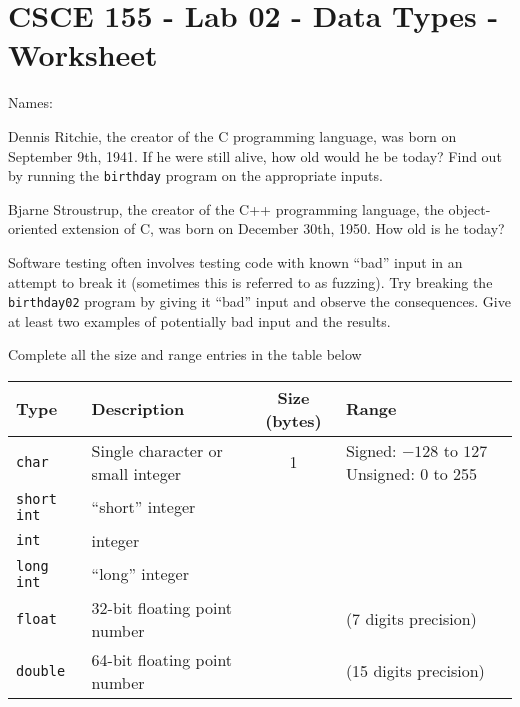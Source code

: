 \documentclass[12pt]{exam}
\begin{document}
\section*{CSCE 155 - Lab 02 - Data Types - Worksheet}

Names: \underline{\hspace{10cm}}

\begin{questions}

\question Dennis Ritchie, the creator of the C programming language,
was born on September 9th, 1941.  If he were still alive, how old
would he be today?  Find out by running the \texttt{birthday}
program on the appropriate inputs.

\begin{solution}[1cm]
\end{solution}

\question Bjarne Stroustrup, the creator of the C++ programming
language, the object-oriented extension of C, was born on December
30th, 1950.  How old is he today?

\begin{solution}[1cm]
\end{solution}

\question Software testing often involves testing code with known
``bad'' input in an attempt to break it (sometimes this is referred
to as fuzzing).  Try breaking the \texttt{birthday02}
program by giving it ``bad'' input and observe the consequences.
Give at least two examples of potentially bad input and the results.

\begin{solution}[1cm]
\end{solution}

\question Complete all the size and range entries in the table below
\begin{table}[h]
\centering
\begin{tabular}{|l|l|c|p{4cm}|}
\hline
Type & Description & Size (bytes) & Range \\
\hline\hline
\texttt{char} & Single character or small integer & 1 &
 Signed: $-128$ to $127$
 Unsigned: 0 to 255 \\
\hline
\texttt{short int} & ``short'' integer & ~ &  \vspace{1cm}\\
\hline
\texttt{int} & integer & ~ &  \vspace{1cm}\\
\hline
\texttt{long int} & ``long'' integer & ~ &  \vspace{1cm}\\
\hline
\texttt{float} & 32-bit floating point number & ~ & (7 digits precision)\\
\hline
\texttt{double} & 64-bit floating point number & ~ & (15 digits precision)\\
\hline
\end{tabular}
\end{table}


\end{questions}
\end{document}

